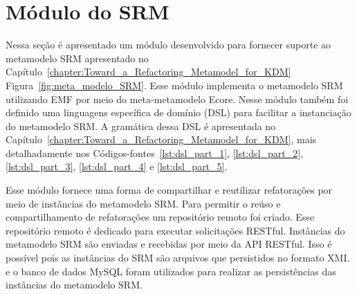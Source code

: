 \section{Módulo do SRM}\label{label:sec_modulo_do_srm}

Nessa seção é apresentado um módulo desenvolvido para fornecer suporte ao metamodelo SRM apresentado no Capítulo~\ref{chapter:Toward_a_Refactoring_Metamodel_for_KDM}  Figura~\ref{fig:meta_modelo_SRM}. Esse módulo implementa o metamodelo SRM utilizando EMF por meio do meta-metamodelo Ecore. Nesse módulo também foi definido uma linguagens específica de domínio (DSL) para facilitar a instanciação do metamodelo SRM. A gramática dessa DSL é apresentada no Capítulo~\ref{chapter:Toward_a_Refactoring_Metamodel_for_KDM}, mais detalhadamente nos Códigos-fontes~\ref{lst:dsl_part_1}, \ref{lst:dsl_part_2}, \ref{lst:dsl_part_3}, \ref{lst:dsl_part_4} e \ref{lst:dsl_part_5}.


Esse módulo fornece uma forma de compartilhar e reutilizar refatorações por meio de instâncias do metamodelo SRM. Para permitir o reúso e compartilhamento de refatorações um repositório remoto foi criado. Esse repositório remoto é dedicado para executar solicitações RESTful. Instâncias do metamodelo SRM são enviadas e recebidas por meio da API RESTful. Isso é possível pois as instâncias do SRM são arquivos que persistidos no formato XMI.  e o banco de dados MySQL foram utilizados para realizar as persistências das instâncias do metamodelo SRM.


